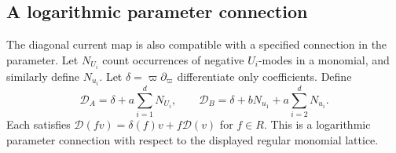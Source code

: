 \subsection{A logarithmic parameter connection}

The diagonal current map is also compatible with a specified
connection in the parameter.  Let \(N_{U_i}\) count occurrences
of negative \(U_i\)-modes in a monomial, and similarly define
\(N_{u_i}\).  Let \(\delta=\varpi\partial_\varpi\) differentiate
only coefficients.  Define
\begin{equation}\label{rc:eq:connections}
 \mathcal D_A=\delta+a\sum_{i=1}^dN_{U_i},\qquad
 \mathcal D_B=\delta+bN_{u_1}
                      +a\sum_{i=2}^dN_{u_i}.
\end{equation}
Each satisfies
\(\mathcal D(fv)=\delta(f)v+f\mathcal D(v)\) for \(f\in R\).
This is a logarithmic parameter connection with respect to
the displayed regular monomial lattice.

